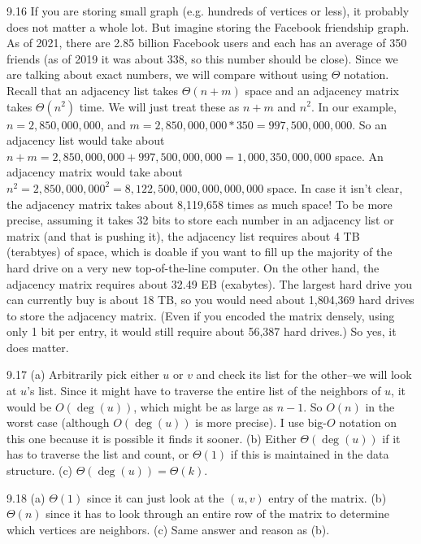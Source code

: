\begin{RequAnswer}{9.16}
If you are storing small graph (e.g. hundreds of vertices or less), it probably does not matter a whole lot.
But imagine storing the Facebook friendship graph. As of 2021, there are 2.85 billion Facebook users
and each has an average of 350 friends (as of 2019 it was about 338, so this number should be close).
Since we are talking about exact numbers, we will compare without using $\Theta$ notation.
Recall that an adjacency list  takes $\Theta(n+m)$ space and an adjacency matrix takes $\Theta(n^2)$ time.
We will just treat these as $n+m$ and $n^2$.
In our example, $n=2,850,000,000$, and $m=2,850,000,000*350=997,500,000,000$.
So an adjacency list would take about $n+m=2,850,000,000+997,500,000,000=1,000,350,000,000$ space.
An adjacency matrix would take about $n^2=2,850,000,000^2=8,122,500,000,000,000,000$ space.
In case it isn't clear, the adjacency matrix takes about 8,119,658 times as much space!
To be more precise, assuming it takes 32 bits to store each number in an adjacency list or matrix
(and that is pushing it),
the adjacency list requires about 4 TB (terabtyes) of space, which is doable if you want to fill up the
majority of the hard drive on a very new top-of-the-line computer.
On the other hand, the adjacency matrix requires about 32.49 EB (exabytes).
The largest hard drive you can currently buy is about 18 TB, so you would need about 1,804,369
hard drives to store the adjacency matrix. (Even if you encoded the matrix densely, using only 1 bit per entry,
it would still require about 56,387 hard drives.)
So yes, it does matter.
\end{RequAnswer}
\begin{RequAnswer}{9.17}
(a) Arbitrarily pick either $u$ or $v$ and check its list for the other--we will look at $u$'s list.
Since it might have to traverse the entire list of the neighbors of $u$, it would be $O(\deg(u))$,
which might be as large as $n-1$. So $O(n)$ in the worst case (although $O(\deg(u))$ is more precise).
I use big-$O$ notation on this one because it is possible it finds it sooner.
(b) Either $\Theta(\deg(u))$ if it has to traverse the list and count,
or $\Theta(1)$ if this is maintained in the data structure.
(c) $\Theta(\deg(u))=\Theta(k)$.
\end{RequAnswer}
\begin{RequAnswer}{9.18}
(a) $\Theta(1)$ since it can just look at the $(u,v)$ entry of the matrix.
(b) $\Theta(n)$ since it has to look through an entire row of the matrix to determine which vertices are neighbors.
(c) Same answer and reason as (b).
\end{RequAnswer}
